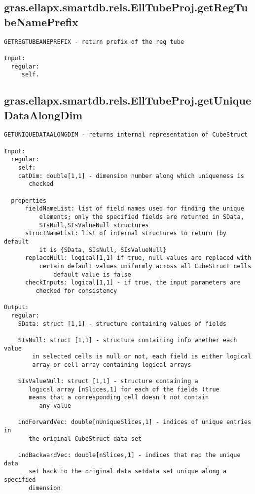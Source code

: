 \subsection{\texorpdfstring{gras.ellapx.smartdb.rels.EllTubeProj.getRegTubeNamePrefix}{getRegTubeNamePrefix}}\label{method:gras.ellapx.smartdb.rels.EllTubeProj.getRegTubeNamePrefix}
\begin{verbatim}
GETREGTUBEANEPREFIX - return prefix of the reg tube

Input:
  regular:
     self.
\end{verbatim}
\subsection{\texorpdfstring{gras.ellapx.smartdb.rels.EllTubeProj.getUniqueDataAlongDim}{getUniqueDataAlongDim}}\label{method:gras.ellapx.smartdb.rels.EllTubeProj.getUniqueDataAlongDim}
\begin{verbatim}
GETUNIQUEDATAALONGDIM - returns internal representation of CubeStruct

Input:
  regular:
    self:
    catDim: double[1,1] - dimension number along which uniqueness is
       checked

  properties
      fieldNameList: list of field names used for finding the unique
          elements; only the specified fields are returned in SData,
          SIsNull,SIsValueNull structures
      structNameList: list of internal structures to return (by default
          it is {SData, SIsNull, SIsValueNull}
      replaceNull: logical[1,1] if true, null values are replaced with
          certain default values uniformly across all CubeStruct cells
              default value is false
      checkInputs: logical[1,1] - if true, the input parameters are
         checked for consistency

Output:
  regular:
    SData: struct [1,1] - structure containing values of fields

    SIsNull: struct [1,1] - structure containing info whether each value
        in selected cells is null or not, each field is either logical
        array or cell array containing logical arrays

    SIsValueNull: struct [1,1] - structure containing a
       logical array [nSlices,1] for each of the fields (true
       means that a corresponding cell doesn't not contain
          any value

    indForwardVec: double[nUniqueSlices,1] - indices of unique entries in
       the original CubeStruct data set

    indBackwardVec: double[nSlices,1] - indices that map the unique data
       set back to the original data setdata set unique along a specified
       dimension
\end{verbatim}
